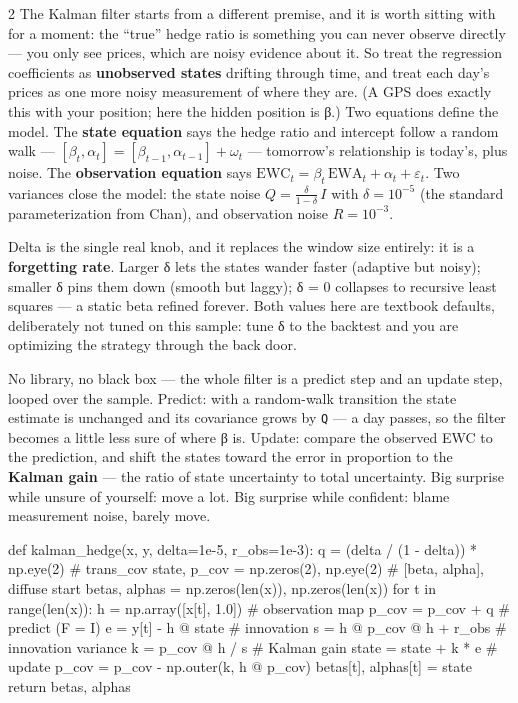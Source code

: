 \documentclass{pyportfolios-note}
\begin{document}
\begin{multicols}{2}
The Kalman filter starts from a different premise, and it is worth sitting with
for a moment: the ``true'' hedge ratio is something you can never observe
directly — you only see prices, which are noisy evidence about it. So treat the
regression coefficients as \textbf{unobserved states} drifting through time, and
treat each day's prices as one more noisy measurement of where they are. (A GPS
does exactly this with your position; here the hidden position is β.) Two
equations define the model. The \textbf{state equation} says the hedge ratio and
intercept follow a random walk —
$[\beta_t, \alpha_t] = [\beta_{t-1}, \alpha_{t-1}] + \omega_t$ — tomorrow's
relationship is today's, plus noise. The \textbf{observation equation} says
$\mathrm{EWC}_t = \beta_t\,\mathrm{EWA}_t + \alpha_t + \varepsilon_t$. Two
variances close the model: the state noise
$Q = \frac{\delta}{1-\delta}\,I$ with $\delta = 10^{-5}$ (the standard
parameterization from Chan), and observation noise $R = 10^{-3}$.

Delta is the single real knob, and it replaces the window size entirely: it is a
\textbf{forgetting rate}. Larger δ lets the states wander faster (adaptive but
noisy); smaller δ pins them down (smooth but laggy); δ = 0 collapses to recursive
least squares — a static beta refined forever. Both values here are textbook
defaults, deliberately not tuned on this sample: tune δ to the backtest and you
are optimizing the strategy through the back door.
\end{multicols}

\noteneedroom{190bp}

No library, no black box — the whole filter is a predict step and an update step,
looped over the sample. Predict: with a random-walk transition the state estimate
is unchanged and its covariance grows by \texttt{Q} — a day passes, so the filter
becomes a little less sure of where β is. Update: compare the observed EWC to the
prediction, and shift the states toward the error in proportion to the
\textbf{Kalman gain} — the ratio of state uncertainty to total uncertainty. Big
surprise while unsure of yourself: move a lot. Big surprise while confident: blame
measurement noise, barely move.

\begin{notecode}
def kalman_hedge(x, y, delta=1e-5, r_obs=1e-3):
    q = (delta / (1 - delta)) * np.eye(2)     # trans_cov
    state, p_cov = np.zeros(2), np.eye(2)     # [beta, alpha], diffuse start
    betas, alphas = np.zeros(len(x)), np.zeros(len(x))
    for t in range(len(x)):
        h = np.array([x[t], 1.0])             # observation map
        p_cov = p_cov + q                     # predict   (F = I)
        e = y[t] - h @ state                  # innovation
        s = h @ p_cov @ h + r_obs             # innovation variance
        k = p_cov @ h / s                     # Kalman gain
        state = state + k * e                 # update
        p_cov = p_cov - np.outer(k, h @ p_cov)
        betas[t], alphas[t] = state
    return betas, alphas
\end{notecode}
\end{document}
